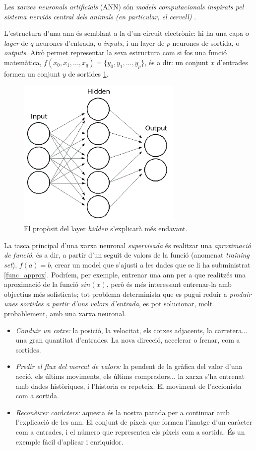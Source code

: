 Les \emph{xarxes neuronals artificials} (ANN) són \emph{models computacionals 
inspirats pel sistema nerviós central dels animals (en particular, el cervell)} \autocite{nnpatrec}.

L'estructura d'una \ac{ann} és semblant a la d'un circuit electrònic: hi ha una capa o \emph{layer}
de $ q $ neurones d'entrada, o \emph{inputs}, i un layer de $ p $ neurones de sortida, o \emph{outputs}.
Això permet representar la seva estructura com si fos una funció matemàtica, $ f(x_0, x_1, ..., x_q) = \{y_0, y_1, ..., y_p\} $,
és a dir: un conjunt $ x $ d'entrades formen un conjunt $ y $ de sortides \ref{simple_ann}.

\begin{figure}[ht!]
\centering
\includegraphics[width=80mm]{data/nn_simple.png}
\caption{El propòsit del layer \emph{hidden} s'explicarà més endavant.}
\label{simple_ann}
\end{figure}

La tasca principal d'una xarxa neuronal \emph{supervisada} és realitzar una \emph{aproximació de funció},
és a dir, a partir d'un seguit de valors de la funció (anomenat \emph{training set}), $ f(a) = b $, crear un model que s'ajusti a les dades
que se li ha subministrat \ref{func_approx}. Podríem, per exemple, entrenar una \ac{ann} per a que realitzés
una aproximació de la funció $ sin(x)$, però és més interessant entrenar-la amb objectius més sofisticats; tot
problema determinista que es pugui reduir a \emph{produir unes sortides a partir d'uns valors d'entrada}, es pot
solucionar, molt probablement, amb una xarxa neuronal.

\begin{itemize}
\item \emph{Conduir un cotxe:} la posició, la velocitat, els cotxes adjacents, la carretera... una gran quantitat d'entrades. La nova direcció, 
accelerar o frenar, com a sortides.
\item \emph{Predir el flux del mercat de valors:} la pendent de la gràfica del valor d'una acció, els últims moviments, els últims compradors...
la xarxa s'ha entrenat amb dades històriques, i l'historia es repeteix. El moviment de l'accionista com a sortida.
\item \emph{Reconèixer caràcters:} aquesta és la nostra parada per a continuar amb l'explicació de les \ac{ann}. El conjunt de píxels que formen 
l'imatge d'un caràcter com a entrades, i el número que representen els píxels com a sortida. És un exemple fàcil d'aplicar i enriquidor.
\end{itemize}

